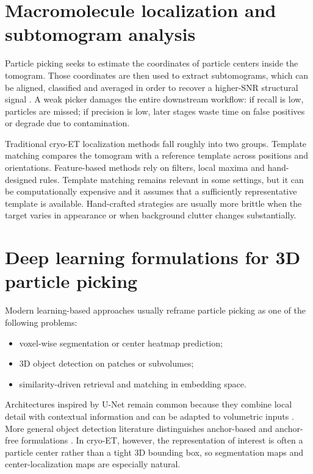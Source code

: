 \documentclass[12pt,a4paper]{report}
\begin{document}
\section{Macromolecule localization and subtomogram analysis}
Particle picking seeks to estimate the coordinates of particle centers inside the tomogram. Those coordinates are then used to extract subtomograms, which can be aligned, classified and averaged in order to recover a higher-SNR structural signal \cite{castanodiez2012dynamo,scheres2012relion}. A weak picker damages the entire downstream workflow: if recall is low, particles are missed; if precision is low, later stages waste time on false positives or degrade due to contamination.

Traditional cryo-ET localization methods fall roughly into two groups. Template matching compares the tomogram with a reference template across positions and orientations. Feature-based methods rely on filters, local maxima and hand-designed rules. Template matching remains relevant in some settings, but it can be computationally expensive and it assumes that a sufficiently representative template is available. Hand-crafted strategies are usually more brittle when the target varies in appearance or when background clutter changes substantially.

\section{Deep learning formulations for 3D particle picking}
Modern learning-based approaches usually reframe particle picking as one of the following problems:
\begin{itemize}
  \item voxel-wise segmentation or center heatmap prediction;
  \item 3D object detection on patches or subvolumes;
  \item similarity-driven retrieval and matching in embedding space.
\end{itemize}

Architectures inspired by U-Net remain common because they combine local detail with contextual information and can be adapted to volumetric inputs \cite{ronneberger2015unet}. More general object detection literature distinguishes anchor-based and anchor-free formulations \cite{ren2015fasterrcnn,lin2017focal,tian2019fcos,zhou2019centernet}. In cryo-ET, however, the representation of interest is often a particle center rather than a tight 3D bounding box, so segmentation maps and center-localization maps are especially natural.
\end{document}
